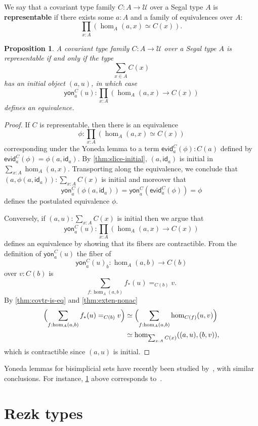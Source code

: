 \documentclass{amsart}
\theoremstyle{plain}
\newtheorem{prop}[thm]{Proposition}
\theoremstyle{definition}
\theoremstyle{remark}
\numberwithin{equation}{section}
\newcommand{\univtype}{\mathcal{U}}
\newcommand{\evid}{\mathsf{evid}}
\newcommand{\yon}{\mathsf{yon}}
\newcommand{\idarr}[1]{\mathsf{id}_{#1}}
\newcommand{\Parens}[1]{\Bigl(#1\Bigr)}
\begin{document}
We say that a covariant type family $C : A \to \univtype$ over a Segal type $A$ is \textbf{representable} if there exists some $a :A$ and a family of equivalences over $A$:
\[ \prod_{x :A} (\hom_A(a,x) \simeq C(x)).\]

\begin{prop}\label{thm:representability} A covariant type family $C : A \to \univtype$ over a Segal type $A$ is representable if and only if the type
\[ \sum_{x \in A} C(x)\] has an initial object $(a,u)$, in which case
\[ \yon^C_a(u) : \prod_{x :A} (\hom_A(a,x) \to C(x))\] defines an equivalence.
\end{prop}
\begin{proof}
If $C$ is representable, then there is an equivalence 
\[ \phi : \prod_{x :A} (\hom_A(a,x) \simeq C(x))\] corresponding under the Yoneda lemma to a term
$\evid^C_a(\phi) : C(a)$ defined by $\evid^C_a(\phi) = \phi(a,\idarr a)$. By \cref{thm:slice-initial}, $(a, \idarr a)$ is initial in $\sum_{x:A}\hom_A(a,x)$. Transporting along the equivalence, we conclude that $(a, \phi(a,\idarr a)) : \sum_{x :A} C(x)$ is initial and moreover that \[ \yon^C_a(\phi(a,\idarr a)) = \yon^C_a( \evid^C_a(\phi)) = \phi\] defines the postulated equivalence $\phi$.

Conversely, if $(a,u) : \sum_{x :A} C(x)$ is initial then we argue that 
\[ \yon^C_a(u) : \prod_{x :A} (\hom_A(a,x) \to C(x))\] defines an equivalence by showing that its fibers are contractible. From the definition of $\yon^C_a(u)$ the fiber of 
\[ \yon^C_a(u)_b : \hom_A(a,b) \to C(b)\] over $v : C(b)$ is \[ \sum_{f : \hom_A(a,b)} f_*(u)=_{C(b)} v.\]
By \cref{thm:covtr-is-eq}  and \cref{thm:exten-nonac}
\begin{align*}
  \Parens{\sum_{f : \hom_A(a,b)} f_*(u)=_{C(b)} v}
  &\simeq \Parens{\sum_{f : \hom_A(a,b)} \hom_{C(f)}(u,v)}\\
  &\simeq \hom_{\sum_{x:A}C(x)}((a,u),(b,v)),
\end{align*}
 which is contractible since $(a,u)$ is initial.
\end{proof}

Yoneda lemmas for bisimplicial sets have recently been studied by~\cite{RV4,kv:yoneda-css,rasekh:yoneda-ss}, with similar conclusions.
For instance, \cref{thm:representability} above corresponds to~\cite[Theorem 5.6]{rasekh:yoneda-ss}.



\section{Rezk types}
\label{sec:Rezk-types}
\end{document}
